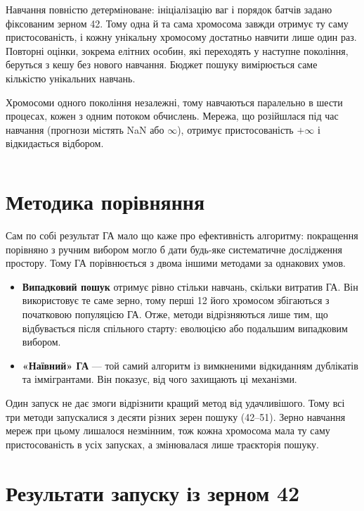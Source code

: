 \documentclass[14pt,a4paper]{extreport}
\begin{document}
Навчання повністю детерміноване: ініціалізацію ваг і порядок батчів задано фіксованим зерном 42. Тому одна й та сама хромосома завжди отримує ту саму пристосованість, і кожну унікальну хромосому достатньо навчити лише один раз. Повторні оцінки, зокрема елітних особин, які переходять у наступне покоління, беруться з кешу без нового навчання. Бюджет пошуку вимірюється саме кількістю унікальних навчань.

Хромосоми одного покоління незалежні, тому навчаються паралельно в шести процесах, кожен з одним потоком обчислень. Мережа, що розійшлася під час навчання (прогнози містять NaN або $\infty$), отримує пристосованість $+\infty$ і відкидається відбором.

\begin{listing}[H]
\inputminted[firstline=187,lastline=198]{python}{../src/aiit/run_lab3.py}
\caption{Функція пристосованості (\texttt{src/aiit/run\_lab3.py})}
\label{lst:fitness}
\end{listing}

\section{Методика порівняння}

Сам по собі результат ГА мало що каже про ефективність алгоритму: покращення порівняно з ручним вибором могло б дати будь-яке систематичне дослідження простору. Тому ГА порівнюється з двома іншими методами за однакових умов.

\begin{itemize}
\item \textbf{Випадковий пошук} отримує рівно стільки навчань, скільки витратив ГА. Він використовує те саме зерно, тому перші 12 його хромосом збігаються з початковою популяцією ГА. Отже, методи відрізняються лише тим, що відбувається після спільного старту: еволюцією або подальшим випадковим вибором.
\item \textbf{«Наївний» ГА} --- той самий алгоритм із вимкненими відкиданням дублікатів та іммігрантами. Він показує, від чого захищають ці механізми.
\end{itemize}

Один запуск не дає змоги відрізнити кращий метод від удачливішого. Тому всі три методи запускалися з десяти різних зерен пошуку (42--51). Зерно навчання мереж при цьому лишалося незмінним, тож кожна хромосома мала ту саму пристосованість в усіх запусках, а змінювалася лише траєкторія пошуку.

\section{Результати запуску із зерном 42}
\end{document}
